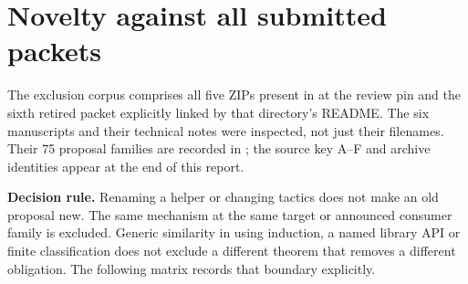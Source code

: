 \section{Novelty against all submitted packets}
\label{sec:novelty}

The exclusion corpus comprises all five ZIPs present in
 at the review pin and the sixth retired packet explicitly
linked by that directory's README. The six manuscripts and their technical
notes were inspected, not just their filenames. Their 75 proposal families are
recorded in ; the source key
A--F and archive identities appear at the end of this report.

\textbf{Decision rule.} Renaming a helper or changing tactics does not make
an old proposal new. The same mechanism at the same target or announced
consumer family is excluded. Generic similarity in using induction, a named
library API or finite classification does not exclude a different theorem
that removes a different obligation. The following matrix records that
boundary explicitly.

